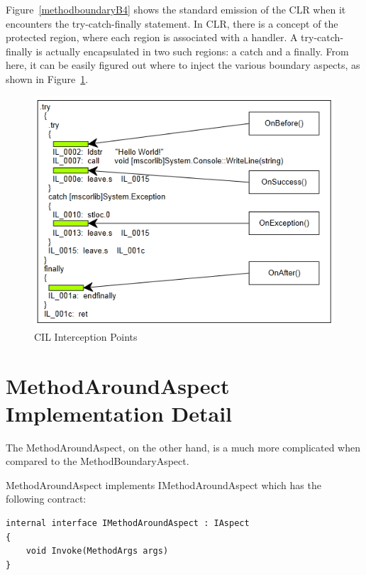 Figure~\ref{methodboundaryB4} shows the standard emission of the CLR when it encounters the try-catch-finally statement. In CLR, there is a concept of the protected region, where each region is associated with a handler. A try-catch-finally is actually encapsulated in two such regions: a catch and a finally. From here, it can be easily figured out where to inject the various boundary aspects, as shown in Figure~\ref{methodboundary02}.

\begin{figure}[H]
  \includegraphics[scale=1.0]{MethodBoundaryOverview.PNG}
  \centering
  \caption{CIL Interception Points\label{methodboundary02}}
\end{figure}

\section{MethodAroundAspect Implementation Detail}

The MethodAroundAspect, on the other hand, is a much more complicated when compared to the MethodBoundaryAspect.

MethodAroundAspect implements IMethodAroundAspect which has the following contract:

\begin{minipage}{\textwidth}
\begin{lstlisting}[caption={IMethodAroundAspect Interface}, label=aroundcontract]
internal interface IMethodAroundAspect : IAspect
{
	void Invoke(MethodArgs args)
}
\end{lstlisting}
\end{minipage}

